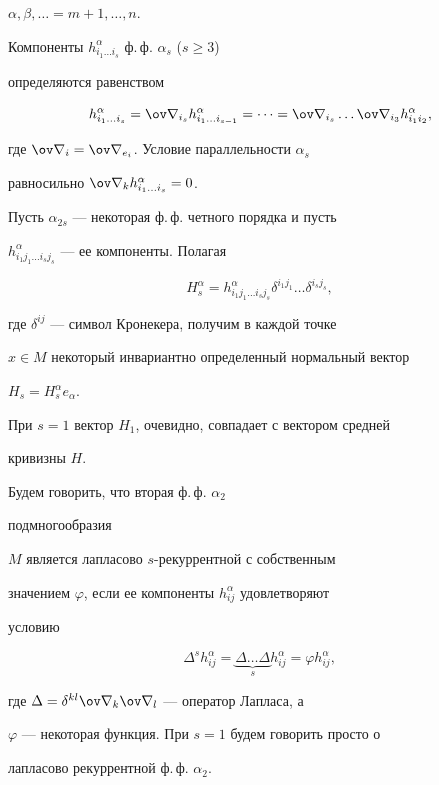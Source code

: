 $\alpha,\beta,\dotsc=m+1,\dotsc,n$.


Компоненты $h^\alpha_{i_1\dots i_s}$ ф.\,ф. $\alpha_s$ ($s\ge 3$)


определяются равенством


$$


h^\alpha_{i_1\dots i_s}=\ov\nabla_{i_s}


h^\alpha_{i_1\dots i_{s-1}}=\dotsb=\ov\nabla_{i_s}\dots


\ov\nabla_{i_3}h^\alpha_{i_1 i_2},


$$


где $\ov\nabla_i=\ov\nabla_{e_i}$. Условие параллельности $\alpha_s$


равносильно $\ov\nabla_k h^\alpha_{i_1\dots i_s}=0$.





Пусть $\alpha_{2s}$ --- некоторая ф.\,ф. четного порядка и пусть


$h^\alpha_{i_1 j_1\dots i_s j_s}$ --- ее компоненты. Полагая


$$


H^\alpha_s=h^\alpha_{i_1 j_1\dots i_s j_s}


\delta^{i_1 j_1}\dots\delta^{i_s j_s},


$$


где $\delta^{ij}$ --- символ Кронекера, получим в каждой точке


$x\in M$ некоторый инвариантно определенный нормальный вектор


$H_s=H^\alpha_s e_\alpha$.


При $s=1$ вектор $H_1$, очевидно, совпадает с вектором средней


кривизны $H$.





\begin{defnnonum} Будем говорить, что вторая ф.\,ф. $\alpha_2$


подмногообразия


$M$ является лапласово $s$-рекуррентной с собственным


значением $\varphi$, если ее компоненты $h^\alpha_{ij}$ удовлетворяют


условию


$$


\Delta^s h^\alpha_{ij}=\underbrace{\Delta\dots\Delta}_s


h^\alpha_{ij}=\varphi h^\alpha_{ij},


$$


где $\Delta=\delta^{kl}\ov\nabla_k\ov\nabla_l$ --- оператор Лапласа, а


$\varphi$ --- некоторая функция. При $s=1$ будем говорить просто о


лапласово рекуррентной ф.\,ф. $\alpha_2$.


\end{defnnonum}






